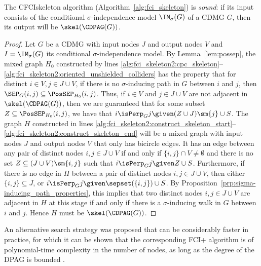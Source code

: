 \begin{Thm}\label{thm:fci_skeleton_sound}
  The CFCIskeleton algorithm (Algorithm~\ref{alg:fci_skeleton}) is \emph{sound}: if its input consists of the conditional $\sigma$-independence model $\IM_\sigma(G)$ of a CDMG $G$, then its output will be $\skel(\CDPAG(G))$.
\end{Thm}
\begin{proof}
  Let $G$ be a CDMG with input nodes $J$ and output nodes $V$ and $I = \IM_\sigma(G)$ its conditional $\sigma$-independence model.
  By Lemma~\ref{lem:possep}, the mixed graph $H_0$ constructed by lines 
  \ref{alg:fci_skeleton2:cpc_skeleton}--\ref{alg:fci_skeleton2:oriented_unshielded_colliders}
  has the property that for distinct $i \in V, j \in J \cup V$, if there is no $\sigma$-inducing path in $G$ between $i$ and $j$, then $\SEP_G(i,j) \subseteq \PosSEP_{H_0}(i,j)$.
  Thus, if $i \in V$ and $j \in J \cup V$ are not adjacent in $\skel(\CDPAG(G))$, then we are guaranteed that for some subset $Z \subseteq \PosSEP_{H_0}(i,j)$, we have that $i \isPerp_G j \given (Z \cup J) \sm \{j\} \cup S$.
  The graph $H$ constructed in lines \ref{alg:fci_skeleton2:construct_skeleton_start}--\ref{alg:fci_skeleton2:construct_skeleton_end} will be a mixed graph with input nodes $J$ and output nodes $V$ that only has bicircle edges.
  It has an edge between any pair of distinct nodes $i,j \in J\cup V$ if and only if $\{i,j\} \cap V \ne \emptyset$ and there is no set $Z \subseteq (J \cup V) \sm \{i,j\}$ such that $i \isPerp_G j \given Z \cup S$.
  Furthermore, if there is no edge in $H$ between a pair of distinct nodes $i,j \in J \cup V$, then either $\{i,j\} \subseteq J$, or $i \isPerp_G j \given \sepset(\{i,j\}) \cup S$.
  By Proposition~\ref{prp:sigma-inducing_path_properties}, this implies that two distinct nodes $i,j \in J \cup V$ are adjacent in $H$ at this stage if and only if there is a $\sigma$-inducing walk in $G$ between $i$ and $j$.
  Hence $H$ must be $\skel(\CDPAG(G))$.
\end{proof}

An alternative search strategy was proposed that can be considerably faster in practice, for which it can be shown that the corresponding FCI+ algorithm is of polynomial-time complexity in the number of nodes, as long as the degree of the DPAG is bounded \cite{ClaassenMooijHeskes_UAI_13}.

